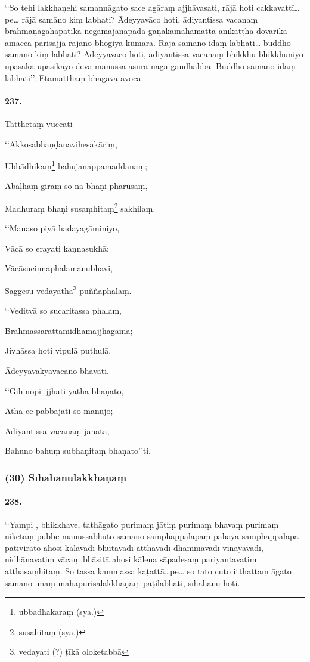 ‘‘So tehi lakkhaṇehi samannāgato sace agāraṃ ajjhāvasati, rājā hoti cakkavattī…pe… rājā samāno kiṃ labhati? Ādeyyavāco hoti, ādiyantissa vacanaṃ brāhmaṇagahapatikā negamajānapadā gaṇakamahāmattā anīkaṭṭhā dovārikā amaccā pārisajjā rājāno bhogiyā kumārā. Rājā samāno idaṃ labhati… buddho samāno kiṃ labhati? Ādeyyavāco hoti, ādiyantissa vacanaṃ bhikkhū bhikkhuniyo upāsakā upāsikāyo devā manussā asurā nāgā gandhabbā. Buddho samāno idaṃ labhati’’. Etamatthaṃ bhagavā avoca.

\paragraph{237.} Tatthetaṃ vuccati –

‘‘Akkosabhaṇḍanavihesakāriṃ,

Ubbādhikaṃ\footnote{ubbādhakaraṃ (syā.)} bahujanappamaddanaṃ;

Abāḷhaṃ giraṃ so na bhaṇi pharusaṃ,

Madhuraṃ bhaṇi susaṃhitaṃ\footnote{susahitaṃ (syā.)} sakhilaṃ.

‘‘Manaso piyā hadayagāminiyo,

Vācā so erayati kaṇṇasukhā;

Vācāsuciṇṇaphalamanubhavi,

Saggesu vedayatha\footnote{vedayati (?) ṭīkā oloketabbā} puññaphalaṃ.

‘‘Veditvā so sucaritassa phalaṃ,

Brahmassarattamidhamajjhagamā;

Jivhāssa hoti vipulā puthulā,

Ādeyyavākyavacano bhavati.

‘‘Gihinopi ijjhati yathā bhaṇato,

Atha ce pabbajati so manujo;

Ādiyantissa vacanaṃ janatā,

Bahuno bahuṃ subhaṇitaṃ bhaṇato’’ti.

\subsubsection{(30) Sīhahanulakkhaṇaṃ}

\paragraph{238.} ‘‘Yampi , bhikkhave, tathāgato purimaṃ jātiṃ purimaṃ bhavaṃ purimaṃ niketaṃ pubbe manussabhūto samāno samphappalāpaṃ pahāya samphappalāpā paṭivirato ahosi kālavādī bhūtavādī atthavādī dhammavādī vinayavādī, nidhānavatiṃ vācaṃ bhāsitā ahosi kālena sāpadesaṃ pariyantavatiṃ atthasaṃhitaṃ. So tassa kammassa kaṭattā…pe… so tato cuto itthattaṃ āgato samāno imaṃ mahāpurisalakkhaṇaṃ paṭilabhati, sīhahanu hoti.

